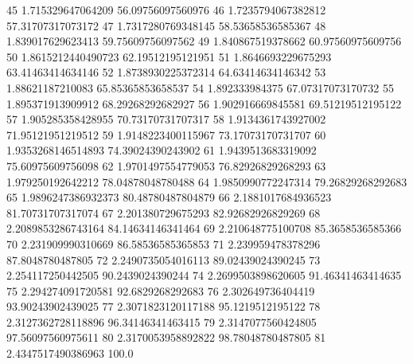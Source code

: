 {45 1.715329647064209 56.09756097560976
46 1.7235794067382812 57.31707317073172
47 1.7317280769348145 58.53658536585367
48 1.839017629623413 59.75609756097562
49 1.840867519378662 60.97560975609756
50 1.8615212440490723 62.19512195121951
51 1.8646693229675293 63.41463414634146
52 1.8738930225372314 64.63414634146342
53 1.88621187210083 65.85365853658537
54 1.892333984375 67.07317073170732
55 1.895371913909912 68.29268292682927
56 1.902916669845581 69.51219512195122
57 1.905285358428955 70.73170731707317
58 1.9134361743927002 71.95121951219512
59 1.9148223400115967 73.17073170731707
60 1.9353268146514893 74.39024390243902
61 1.9439513683319092 75.60975609756098
62 1.9701497554779053 76.82926829268293
63 1.979250192642212 78.04878048780488
64 1.9850990772247314 79.26829268292683
65 1.9896247386932373 80.48780487804879
66 2.1881017684936523 81.70731707317074
67 2.201380729675293 82.92682926829269
68 2.2089853286743164 84.14634146341464
69 2.210648775100708 85.3658536585366
70 2.231909990310669 86.58536585365853
71 2.239959478378296 87.8048780487805
72 2.2490735054016113 89.02439024390245
73 2.254117250442505 90.2439024390244
74 2.2699503898620605 91.46341463414635
75 2.294274091720581 92.6829268292683
76 2.302649736404419 93.90243902439025
77 2.3071823120117188 95.1219512195122
78 2.3127362728118896 96.34146341463415
79 2.3147077560424805 97.56097560975611
80 2.3170053958892822 98.78048780487805
81 2.4347517490386963 100.0
}\tableexpivecdfwordlangshev
